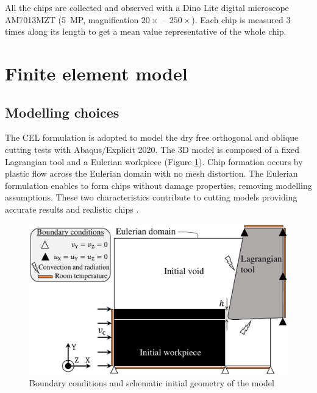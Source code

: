 \documentclass[preprint,12pt,times]{elsarticle}
\begin{document}
All the chips are collected and observed with a Dino Lite digital microscope AM7013MZT (5~MP, magnification $20\times$ -- $250\times$). Each chip is measured 3 times along its length to get a mean value representative of the whole chip.


\section{Finite element model}
\label{FEM}

\subsection{Modelling choices}

The CEL formulation is adopted to model the dry free orthogonal and oblique cutting tests with Abaqus/Explicit 2020. The 3D model is composed of a fixed Lagrangian tool and a Eulerian workpiece (Figure \ref{fig:BC}). Chip formation occurs by plastic flow across the Eulerian domain with no mesh distortion. The Eulerian formulation enables to form chips without damage properties, removing modelling assumptions. These two characteristics contribute to cutting models providing accurate results and realistic chips \cite{ducobu_Application_2016}.

\begin{figure}[!h]
\centering
\includegraphics[width = 140 mm]{Figures/BC} %
\caption{Boundary conditions and schematic initial geometry of the model}
\label{fig:BC}
\end{figure}
\end{document}

